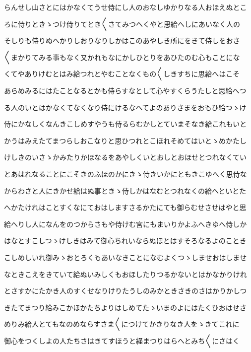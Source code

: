 \documentclass[a4paper,11pt,landscape]{ltjtarticle}
\begin{document}
\par\medskip
らんせし山さとにはかなくてうせ侍にし人のおなしゆかりなる人おほえぬとこ
\par\medskip
ろに侍りときゝつけ侍りてとき〱さてみつへくやと思給へしにあいなく人の
\par\medskip
そしりも侍りぬへかりしおりなりしかはこのあやしき所にをきて侍しをおさ
\par\medskip
〱まかりてみる事もなく又かれもなにかしひとりをあひたのむ心もことにな
\par\medskip
くてやありけむとはみ給つれとやむことなくもの〱しきすちに思給へはこそ
\par\medskip
あらめみるにはたことなるとかも侍らすなとして心やすくらうたしと思給へつ
\par\medskip
る人のいとはかなくてなくなり侍にけるなへてよのありさまをおもひ給つゝけ
\par\medskip
侍にかなしくなんきこしめすやうも侍るらむかしとていまそなき給これもいと
\par\medskip
かうはみえたてまつらしおこなりと思ひつれとこほれそめてはいとゝめかたし
\par\medskip
けしきのいさゝかみたりかほなるをあやしくいとおしとおほせとつれなくてい
\par\medskip
とあはれなることにこそきのふほのかにきゝ侍きいかにともきこゆへく思侍な
\par\medskip
からわさと人にきかせ給はぬ事ときゝ侍しかはなむとつれなくの給へといとた
\par\medskip
へかたけれはことすくなにておはしますさるかたにても御らむせさせはやと思
\par\medskip
給へりし人になんをのつからさもや侍けむ宮にもまいりかよふへきゆへ侍しか
\par\medskip
はなとすこしつゝけしきはみて御心ちれいならぬほとはすそろなるよのことき
\par\medskip
こしめしいれ御みゝおとろくもあいなきことになむよくつゝしませおはしませ
\par\medskip
なときこえをきていて給ぬいみしくもおほしたりつるかないとはかなかりけれ
\par\medskip
とさすかにたかき人のすくせなりけりたうしのみかときさきのさはかりかしつ
\par\medskip
きたてまつり給みこかほかたちよりはしめてたゝいまのよにはたくひおはせさ
\par\medskip
めりみ給人とてもなのめならすさま〱につけてかきりなき人をゝきてこれに
\par\medskip
御心をつくしよの人たちさはきてすほうと経まつりはらへとみち〱にさはく
\par\medskip
\end{document}
